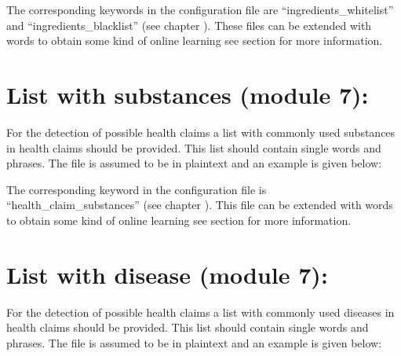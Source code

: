 \documentclass[letterpaper,10pt,english]{sphinxmanual}
\begin{document}
%
\begin{sphinxVerbatim}[commandchars=\\\{\}]
\end{sphinxVerbatim}

The corresponding keywords in the configuration file are
“ingredients\_whitelist” and “ingredients\_blacklist” (see chapter
{\hyperref[\detokenize{configuration:configuration}]{}}). These files can be extended with words to
obtain some kind of online learning see section
{\hyperref[\detokenize{online_learning:black-white-online}]{}} for more information.


\section{List with substances (module 7):}
\label{\detokenize{external_data:external-hc-substances}}\label{\detokenize{external_data:list-with-substances-module-7}}
For the detection of possible health claims a list with commonly used
substances in health claims should be provided. This list should
contain single words and phrases. The file is assumed to be in
plaintext and an example is given below:

%
\begin{sphinxVerbatim}[commandchars=\\\{\}]
 
\end{sphinxVerbatim}

The corresponding keyword in the configuration file is
“health\_claim\_substances” (see chapter {\hyperref[\detokenize{configuration:configuration}]{}}). This
file can be extended with words to obtain some kind of online learning
see section {\hyperref[\detokenize{online_learning:substances-online}]{}} for more information.


\section{List with disease (module 7):}
\label{\detokenize{external_data:list-with-disease-module-7}}\label{\detokenize{external_data:external-hc-disease}}
For the detection of possible health claims a list with commonly used
diseases in health claims should be provided. This list should contain
single words and phrases. The file is assumed to be in plaintext and
an example is given below:
\end{document}
